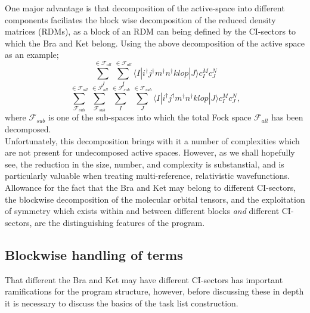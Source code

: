 \documentclass[12pt]{article}
\begin{document}
\noindent One major advantage is that decomposition of the active-space
into different components faciliates the block wise decomposition of the reduced density matrices (RDMs),
as a block of an RDM can being defined by the CI-sectors to 
which the Bra and Ket belong. Using the above decomposition of the 
active space as an example;
\begin{equation*}
\sum_{J}^{ \in \mathcal{F}_{all} }
\sum_{I}^{ \in \mathcal{F}_{all} } \langle I | i^{\dagger}j^{\dagger}m^{\dagger}n^{\dagger}klop | J \rangle c^{M}_{I} c_{J}^{N}
\end{equation*}
\begin{equation*}
\sum^{ \in \mathcal{F}_{all} }_{ \mathcal{F}_{sub} }
\sum^{ \in \mathcal{F}_{all} }_{ \mathcal{F}_{sub} }
\sum^{ \in \mathcal{F}_{sub}}_{I}
\sum^{ \in \mathcal{F}_{sub}}_{J} \langle I | i^{\dagger}j^{\dagger}m^{\dagger}n^{\dagger}klop | J \rangle c^{M}_{I} c_{J}^{N},
\end{equation*}
\noindent where $\mathcal{F}_{sub}$ is one of the sub-spaces
into which the total Fock space $\mathcal{F}_{all}$ has been decomposed.\\

\noindent Unfortunately, this decomposition brings with it a number of
complexities which are not present for undecomposed active spaces. However, 
as we shall hopefully see, the reduction in the size, number, and complexity is
substanstial, and is particularly valuable when treating multi-reference,
relativistic wavefunctions.\\ 

\noindent Allowance for the fact that the Bra and Ket may belong to different CI-sectors,
the blockwise decomposition of the molecular orbital tensors, and the exploitation 
of symmetry which exists within and between different blocks \emph{and}  different CI-sectors,
are the distinguishing features of the program.

\subsection{ Blockwise handling of terms } 
\noindent That different the Bra and Ket may have different CI-sectors has
important ramifications for the program structure, however, before discussing
these in depth it is necessary to discuss the basics of the task list
construction.\\
\end{document}
